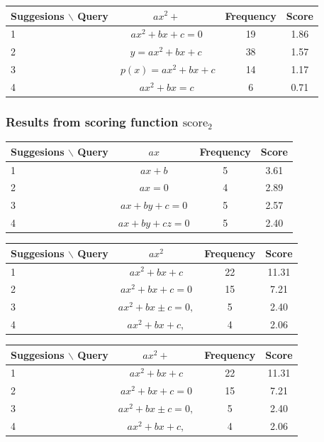 \documentclass[12pt]{article} %
\begin{document}
\begin{center}
\begin{tabular}{lccc}
Suggesions $\backslash$ Query  & $ ax^2 + $ & Frequency & Score \\
\hline
 1 &  $ ax^{2}+bx+c=0 $ & 19 & 1.86 \\
 2 &  $ y=ax^{2}+bx+c\, $ & 38 & 1.57 \\
 3 &  $ \ p(x)=ax^{2}+bx+c $ & 14 & 1.17 \\
 4 &  $ ax^{2}+bx=c $ & 6 & 0.71 \\
\end{tabular}
\end{center}

\subsubsection{Results from scoring function $\text{score}_2$}

\begin{center}
\begin{tabular}{lccc}
Suggesions $\backslash$ Query  & $ ax $ & Frequency & Score \\
\hline
 1 &  $ ax + b $ & 5 & 3.61 \\
 2 &  $ ax = 0 $ & 4 & 2.89 \\
 3 &  $ ax+by+c=0 $ & 5 & 2.57 \\
 4 &  $ ax+by+cz=0 $ & 5 & 2.40 \\
\end{tabular}
\end{center}

\begin{center}
\begin{tabular}{lccc}
Suggesions $\backslash$ Query  & $ ax^2 $ & Frequency & Score \\
\hline
 1 &  $ ax^{2}+bx+c $ & 22 & 11.31 \\
 2 &  $ ax^{2}+bx+c=0 $ & 15 & 7.21 \\
 3 &  $ ax^{2}+bx\pm c=0, $ & 5 & 2.40 \\
 4 &  $ ax^{2}+bx+c, $ & 4 & 2.06 \\
\end{tabular}
\end{center}

\begin{center}
\begin{tabular}{lccc}
Suggesions $\backslash$ Query  & $ ax^2 + $ & Frequency & Score \\
\hline
 1 &  $ ax^{2}+bx+c $ & 22 & 11.31 \\
 2 &  $ ax^{2}+bx+c=0 $ & 15 & 7.21 \\
 3 &  $ ax^{2}+bx\pm c=0, $ & 5 & 2.40 \\
 4 &  $ ax^{2}+bx+c, $ & 4 & 2.06 \\
\end{tabular}
\end{center}
\end{document}
